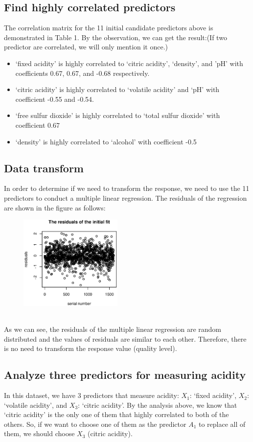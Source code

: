 \documentclass[11pt, oneside]{article}   	%
\begin{document}
\subsection{Find highly correlated predictors}
The correlation matrix for the 11 initial candidate predictors above is demonstrated in Table 1. By the observation, we can get the result:(If two predictor are correlated, we will only mention it once.)
\begin{itemize}
\item `fixed acidity' is highly correlated to `citric acidity', `density', and 'pH' with coefficients 0.67, 0.67, and -0.68 respectively.
\item `citric acidity' is highly correlated to `volatile acidity' and `pH' with coefficient -0.55 and -0.54.
\item `free sulfur dioxide' is highly correlated to `total sulfur dioxide' with coefficient 0.67
\item  `density' is highly correlated to `alcohol' with coefficient -0.5
\end{itemize}
\subsection{Data transform}
In order to determine if we need to transform the response, we need to use the 11 predictors to conduct a multiple linear regression. The residuals of the regression are shown in the figure as follows:
\begin{figure}[!htbp] 
\centering\includegraphics[width=2in]{fit0residuals.eps}  
\end{figure}
\\ 
As we can see, the residuals of the multiple linear regression are random distributed and the values of residuals are similar to each other. Therefore, there is no need to transform the response value (quality level). 
\subsection{Analyze three predictors for measuring acidity}
In this dataset, we have 3 predictors that measure acidity: $X_1$: `fixed acidity', $X_2$: `volatile acidity', and $X_3$: `citric acidity'. By the analysis above, we know that `citric acidity' is the only one of them that highly correlated to both of the others. So, if we want to choose one of them as the predictor $A_1$ to replace all of them, we should choose $X_3$ (citric acidity).
\end{document}
